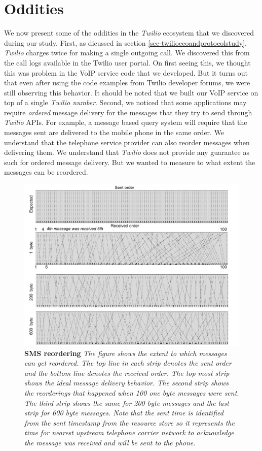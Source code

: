 \section{Oddities}
\label{sec-oddities}

We now present some of the oddities in the \textit{Twilio} ecosystem that we discovered during our study. First, as dicussed in section \ref{sec-twilioecoandprotocolstudy}, \textit{Twilio} charges twice for making a single outgoing call. We discovered this from the call logs available in the Twilio user portal. On first seeing this, we thought this was problem in the VoIP service code that we developed. But it turns out that even after using the code examples from Twilio developer forums, we were still observing this behavior. It should be noted that we built our VoIP service on top of a single \textit{Twilio number}. Second, we noticed that some applications may require \textit{ordered} message delivery for the messages that they try to send through \textit{Twilio} APIs. For example, a message based query system will require that the messages sent are delivered to the mobile phone in the same order. We understand that the telephone service provider can also reorder messages when delivering them. We understand that \textit{Twilio} does not provide any guarantee as such for ordered message delivery. But we wanted to measure to what extent the messages can be reordered. 

\begin{figure}[t!] \centering
\includegraphics[width=\textwidth]{figs/reordering.pdf}
\caption{\label{reordering}\textbf{SMS reordering} {\footnotesize\textit{
The figure shows the extent to which messages can get reordered. The top line in each strip denotes the sent order and the bottom line denotes the received order. The top most strip shows the ideal message delivery behavior. The second strip shows the reorderings that happened when 100 one byte messages were sent. The third strip shows the same for 200 byte messages and the last strip for 600 byte messages. Note that the sent time is identified from the \textit{sent timestamp} from the resource store so it represents the time for nearest upstream telephone carrier network to acknowledge the message was received and will be sent to the phone. 
}}}
\end{figure}

